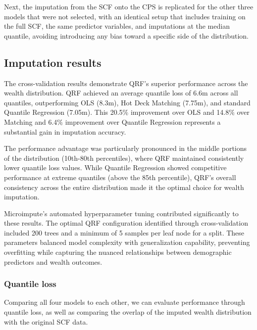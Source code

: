 Next, the imputation from the SCF onto the CPS is replicated for the other three models that were not selected, with an identical setup that includes training on the full SCF, the same predictor variables, and imputations at the median quantile, avoiding introducing any bias toward a specific side of the distribution. 

\subsection{Imputation results}

The cross-validation results demonstrate QRF's superior performance across the wealth distribution. QRF achieved an average quantile loss of 6.6m across all quantiles, outperforming OLS (8.3m), Hot Deck Matching (7.75m), and standard Quantile Regression (7.05m). This 20.5\% improvement over OLS and 14.8\% over Matching and 6.4\% improvement over Quantile Regression represents a substantial gain in imputation accuracy.

The performance advantage was particularly pronounced in the middle portions of the distribution (10th-80th percentiles), where QRF maintained consistently lower quantile loss values. While Quantile Regression showed competitive performance at extreme quantiles (above the 85th percentile), QRF's overall consistency across the entire distribution made it the optimal choice for wealth imputation.

Microimpute's automated hyperparameter tuning contributed significantly to these results. The optimal QRF configuration identified through cross-validation included 200 trees and a minimum of 5 samples per leaf node for a split. These parameters balanced model complexity with generalization capability, preventing overfitting while capturing the nuanced relationships between demographic predictors and wealth outcomes.

\subsubsection{Quantile loss}

Comparing all four models to each other, we can evaluate performance through quantile loss, as well as comparing the overlap of the imputed wealth distribution with the original SCF data. 

